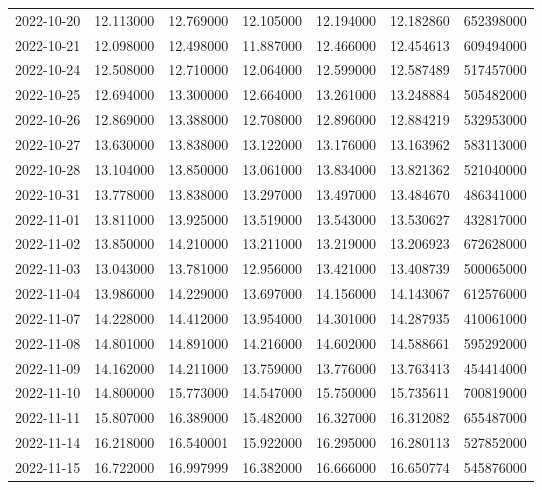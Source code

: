 \begin{tabular}{lrrrrrr}
2022-10-20 &   12.113000 &   12.769000 &   12.105000 &   12.194000 &   12.182860 &   652398000 \\
2022-10-21 &   12.098000 &   12.498000 &   11.887000 &   12.466000 &   12.454613 &   609494000 \\
2022-10-24 &   12.508000 &   12.710000 &   12.064000 &   12.599000 &   12.587489 &   517457000 \\
2022-10-25 &   12.694000 &   13.300000 &   12.664000 &   13.261000 &   13.248884 &   505482000 \\
2022-10-26 &   12.869000 &   13.388000 &   12.708000 &   12.896000 &   12.884219 &   532953000 \\
2022-10-27 &   13.630000 &   13.838000 &   13.122000 &   13.176000 &   13.163962 &   583113000 \\
2022-10-28 &   13.104000 &   13.850000 &   13.061000 &   13.834000 &   13.821362 &   521040000 \\
2022-10-31 &   13.778000 &   13.838000 &   13.297000 &   13.497000 &   13.484670 &   486341000 \\
2022-11-01 &   13.811000 &   13.925000 &   13.519000 &   13.543000 &   13.530627 &   432817000 \\
2022-11-02 &   13.850000 &   14.210000 &   13.211000 &   13.219000 &   13.206923 &   672628000 \\
2022-11-03 &   13.043000 &   13.781000 &   12.956000 &   13.421000 &   13.408739 &   500065000 \\
2022-11-04 &   13.986000 &   14.229000 &   13.697000 &   14.156000 &   14.143067 &   612576000 \\
2022-11-07 &   14.228000 &   14.412000 &   13.954000 &   14.301000 &   14.287935 &   410061000 \\
2022-11-08 &   14.801000 &   14.891000 &   14.216000 &   14.602000 &   14.588661 &   595292000 \\
2022-11-09 &   14.162000 &   14.211000 &   13.759000 &   13.776000 &   13.763413 &   454414000 \\
2022-11-10 &   14.800000 &   15.773000 &   14.547000 &   15.750000 &   15.735611 &   700819000 \\
2022-11-11 &   15.807000 &   16.389000 &   15.482000 &   16.327000 &   16.312082 &   655487000 \\
2022-11-14 &   16.218000 &   16.540001 &   15.922000 &   16.295000 &   16.280113 &   527852000 \\
2022-11-15 &   16.722000 &   16.997999 &   16.382000 &   16.666000 &   16.650774 &   545876000 \\

\end{tabular}
